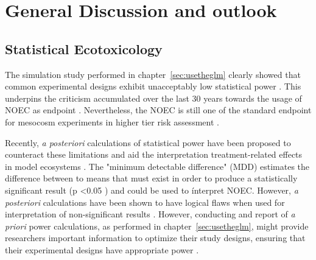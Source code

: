 \chapter{General Discussion and outlook}
\label{sec:discussion} 
 
\section{Statistical Ecotoxicology}
The simulation study performed in chapter~\ref{sec:usetheglm} clearly showed that common experimental designs exhibit unacceptably low statistical power \citep{szocs_statistical_2016, van_der_hoeven_power_1998}.
This underpins the criticism accumulated over the last 30 years towards the usage of NOEC as endpoint \citep{fox_comment_2016}. 
Nevertheless, the NOEC is still one of the standard endpoint for mesocosm experiments in higher tier risk assessment \citep{efsa_guidance_2013}.

Recently, \emph{a posteriori} calculations of statistical power have been proposed to counteract these limitations and aid the interpretation treatment-related effects in model ecosystems \citep{brock_minimum_2015}.
The "minimum detectable difference" (MDD) estimates the difference between to means that must exist in order to produce a statistically significant result (p \textless 0.05 \citep{gelman_difference_2006}) and could be used to ínterpret NOEC.
However, \emph{a posteriori} calculations have been shown to have logical flaws when used for interpretation of non-significant results \citep{hoenig_abuse_2001, nakagawa_case_2004}. 
However, conducting and report of \emph{a priori} power calculations, as performed in chapter~\ref{sec:usetheglm}, might provide researchers important information to optimize their study designs, ensuring that their experimental designs have appropriate power \citep{johnson_power_2015}.

